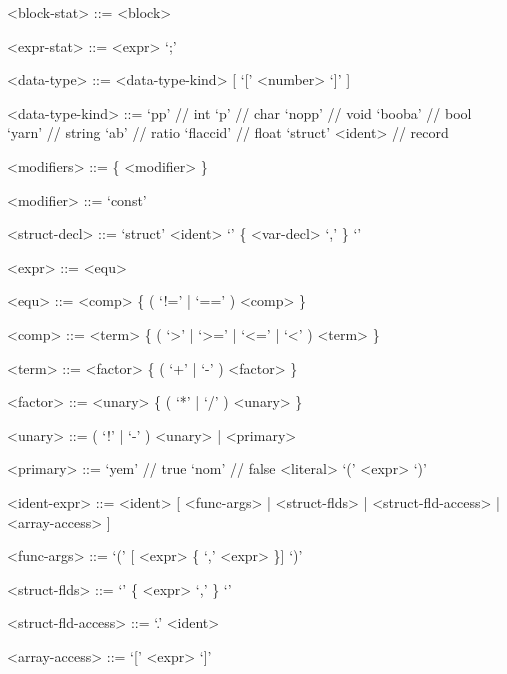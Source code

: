 \documentclass[12pt, a4paper]{article}
\begin{document}
\begin{grammar}
        <block-stat> ::= <block>

        <expr-stat> ::= <expr> `;'

        <data-type> ::= <data-type-kind> [ `[' <number> `]' ]

        <data-type-kind> ::= `pp' // int
        \alt `p' // char
        \alt `nopp' // void
        \alt `booba' // bool
        \alt `yarn' // string
        \alt `ab' // ratio
        \alt `flaccid' // float
        \alt `struct' <ident> // record

        <modifiers> ::= \{ <modifier> \}

        <modifier> ::= `const'

        <struct-decl> ::= `struct' <ident> `{' \{ <var-decl> `,' \} `}'

        <expr> ::= <equ>

        <equ> ::= <comp> \{ ( `!=' | `==' ) <comp> \}

        <comp> ::= <term> \{ ( `>' | `>=' | `<=' | `<' ) <term> \}

        <term> ::= <factor> \{ ( `+' | `-' ) <factor> \}

        <factor> ::= <unary> \{ ( `*' | `/' ) <unary> \}

        <unary> ::= ( `!' | `-' ) <unary> | <primary>

        <primary> ::= `yem' // true
        \alt `nom' // false
        \alt <literal>
        \alt `(' <expr> `)'

        <ident-expr> ::= <ident> [ <func-args> | <struct-flds> | <struct-fld-access> | <array-access> ]

        <func-args> ::= `(' [ <expr> \{ `,' <expr> \}] `)'

        <struct-flds> ::= `{' \{ <expr> `,' \} `}'

        <struct-fld-access> ::= `.' <ident>

        <array-access> ::= `[' <expr> `]'
    \end{grammar}
\end{document}
